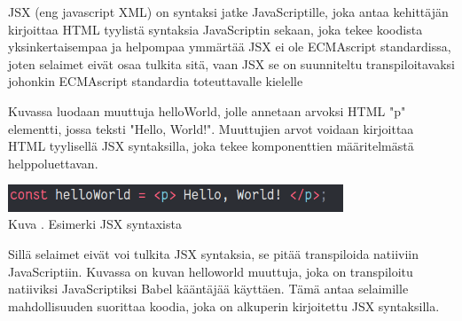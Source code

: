 








JSX (eng javascript XML) on syntaksi jatke JavaScriptille, joka antaa kehittäjän kirjoittaa HTML tyylistä syntaksia JavaScriptin sekaan,
joka tekee koodista yksinkertaisempaa ja helpompaa ymmärtää
JSX ei ole ECMAscript standardissa, joten selaimet eivät osaa tulkita sitä,
vaan JSX se on suunniteltu transpiloitavaksi johonkin ECMAscript standardia toteuttavalle kielelle
\medskip






Kuvassa \nextImageCount{} luodaan muuttuja helloWorld, jolle annetaan arvoksi HTML "p"{} elementti, jossa teksti "Hello, World!"{}.
Muuttujien arvot voidaan kirjoittaa HTML tyylisellä JSX syntaksilla, 
joka tekee komponenttien määritelmästä helppoluettavan.
\medskip



\bigskip
\includegraphics[width=10cm]{src/public/oppar/pure_jsx_example.png}\\
Kuva \getImgCount {}. Esimerki JSX syntaxista
\medskip




Sillä selaimet eivät voi tulkita JSX syntaksia, se pitää transpiloida natiiviin JavaScriptiin.
Kuvassa \nextImageCount{} on kuvan \theimgCounter{} helloworld muuttuja, joka on transpiloitu natiiviksi JavaScriptiksi Babel kääntäjää käyttäen. 
Tämä antaa selaimille mahdollisuuden suorittaa koodia, joka on alkuperin kirjoitettu JSX syntaksilla.
\medskip


